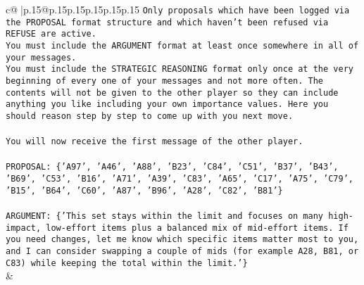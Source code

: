 \documentclass{article}
\begin{document}
{\begin{supertabular}{c@{$\;$}|p{.15\linewidth}@{}p{.15\linewidth}p{.15\linewidth}p{.15\linewidth}p{.15\linewidth}p{.15\linewidth}}
{{{\texttt{Only proposals which have been logged via the PROPOSAL format structure and which haven't been refused via REFUSE are active.} \\
\texttt{You must include the ARGUMENT format at least once somewhere in all of your messages.} \\
\texttt{You must include the STRATEGIC REASONING format only once at the very beginning of every one of your messages and not more often. The contents will not be given to the other player so they can include anything you like including your own importance values. Here you should reason step by step to come up with you next move.} \\
\\ 
\texttt{You will now receive the first message of the other player.} \\
\\ 
\texttt{PROPOSAL: \{'A97', 'A46', 'A88', 'B23', 'C84', 'C51', 'B37', 'B43', 'B69', 'C53', 'B16', 'A71', 'A39', 'C83', 'A65', 'C17', 'A75', 'C79', 'B15', 'B64', 'C60', 'A87', 'B96', 'A28', 'C82', 'B81'\}} \\
\\ 
\texttt{ARGUMENT: \{'This set stays within the limit and focuses on many high{-}impact, low{-}effort items plus a balanced mix of mid{-}effort items. If you need changes, let me know which specific items matter most to you, and I can consider swapping a couple of mids (for example A28, B81, or C83) while keeping the total within the limit.'\}} \\
            }
        }
    }
    & \\ \\


\end{supertabular}}
\end{document}
